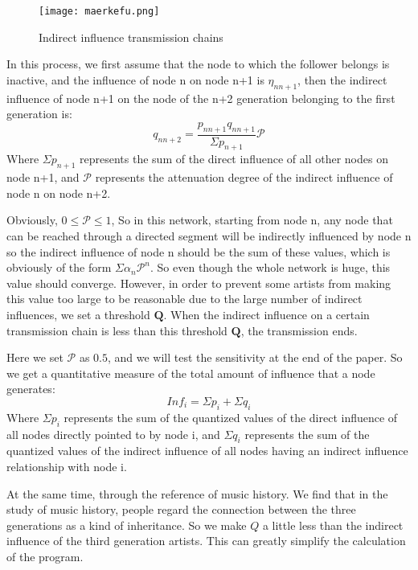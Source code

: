 \documentclass[12pt]{article}  %
\begin{document}
\begin{figure}[H]
	\centering
	\texttt{[image: maerkefu.png]}
	\caption{Indirect influence transmission chains}
	\label{img}
\end{figure}

In this process, we first assume that the node to which the follower belongs is inactive, and the influence of node n on node n+1 is $\eta_{nn+1} $, then the indirect influence of node n+1 on the node of the n+2 generation belonging to the first generation is:
\begin{equation}
q_{nn+2}=\frac{p _{nn+1}q_{nn+1}}{\Sigma p _{n+1}}\mathcal{P}  
\end{equation}
Where $\Sigma p _{n+1}$ represents the sum of the direct influence of all other nodes on node n+1, and $\mathcal{P}$ represents the attenuation degree of the indirect influence of node n on node n+2.

Obviously, $0\leqslant \mathcal{P} \leqslant 1$, So in this network, starting from node n, any node that can be reached through a directed segment will be indirectly influenced by node n so the indirect influence of node n should be the sum of these values, which is obviously of the form $\Sigma \alpha _{n}\mathcal{P} ^{n}$. So even though the whole network is huge, this value should converge. However, in order to prevent some artists from making this value too large to be reasonable due to the large number of indirect influences, we set a threshold $\mathbf{Q} $. When the indirect influence on a certain transmission chain is less than this threshold $\mathbf{Q} $, the transmission ends.

Here we set $\mathcal{P} $ as $0.5$, and we will test the sensitivity at the end of the paper.
So we get a quantitative measure of the total amount of influence that a node generates:
\begin{equation}
Inf_{i}=\Sigma p_{i}+\Sigma q_{i}
\end{equation}
Where $\Sigma p_{i}$ represents the sum of the quantized values of the direct influence of all nodes directly pointed to by node i, and $\Sigma q_{i}$ represents the sum of the quantized values of the indirect influence of all nodes having an indirect influence relationship with node i.

At the same time, through the reference of music history. We find that in the study of music history, people regard the connection between the three generations as a kind of inheritance. So we make $Q$ a little less than the indirect influence of the third generation artists. This can greatly simplify the calculation of the program.
\end{document}
